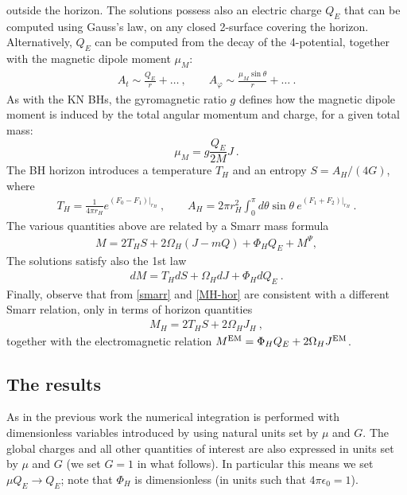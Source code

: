outside the horizon.  
The solutions possess also an electric charge $Q_E$ that can be computed using Gauss's law, 
on any closed 2-surface covering the horizon. 
Alternatively, $Q_E$ can be computed from the decay of the 4-potential, together with the magnetic dipole moment $\mu_M$:
%
 \begin{eqnarray}
 \label{asym-matter-fields}
A_t\sim 
\frac{Q_E}{r}+\dots \ , \qquad A_{\varphi}\sim \frac{\mu_M \sin \theta}{r}+\dots\
 .
 \end{eqnarray}
As with the KN BHs, the gyromagnetic ratio $g$ defines how the magnetic dipole moment 
is induced by the total angular momentum and charge, for a given total mass:
 \begin{equation}
 \mu_M=g\frac{Q_E}{2M}J \ .
 \label{gyro}
 \end{equation}
The BH horizon introduces a temperature $T_H$ and an entropy $S={A_H}/({4G})$,
where 
%
\begin{eqnarray}
\label{THAH}
T_H=\frac{1}{4\pi r_H}e^{(F_0-F_1)|_{r_H}}\ ,
\qquad
A_H=2\pi r_H^2 \int_0^\pi d\theta \sin \theta~e^{(F_1+F_2)|_{r_H}} \ .
\end{eqnarray}
%
The various quantities above are related by a Smarr mass formula 
%
\begin{eqnarray}
\label{smarr}
M=2 T_H S +2\Omega_H (J-m Q) + \Phi_H Q_E+ M^\Psi,
\end{eqnarray}
The solutions satisfy also the 1st law 
%
\begin{eqnarray}
\label{first-law}
dM=T_H dS +\Omega_H dJ + \Phi_H dQ_E\ .
\end{eqnarray}
%
Finally, observe that from \eqref{smarr} and \eqref{MH-hor} are consistent with a different Smarr relation, only in terms of horizon quantities  
%
%
\begin{eqnarray} 
\label{rel-hor}
M_H=2T_H S+2 \Omega_H J_H~,
\end{eqnarray}
together with the electromagnetic relation $M^{\rm EM}=\Phi_HQ_E+2\Omega_HJ^{\rm EM}$.




\subsection{The results }
\label{sec_results_u}
As in the previous work \cite{Herdeiro:2015gia,Herdeiro:2016tmi}
the numerical integration is performed with 
dimensionless variables introduced by using natural units set by $\mu$ and $G$.
The global charges and all other quantities of interest are also
 expressed in units set by $\mu$ and $G$ 
(we set $G=1$ in what follows). 
In particular this means we set $\mu Q_E\rightarrow Q_E$; 
note that $\Phi_H$ is dimensionless (in units such that $4\pi \epsilon_0=1$). 

